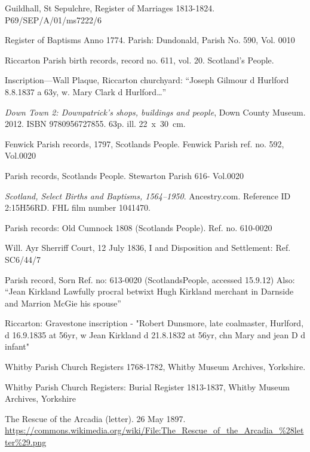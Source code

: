 \begin{thebibliography}{99}
	 Guildhall, St Sepulchre, Register of Marriages 1813-1824. P69/SEP/A/01/ms7222/6

	 Register of Baptisms Anno 1774. Parish: Dundonald, Parish No. 590, Vol. 0010

	Riccarton Parish birth records, record no. 611, vol. 20. Scotland's People.

	Inscription---Wall Plaque, Riccarton churchyard:
	``Joseph Gilmour d Hurlford 8.8.1837 a 63y, w. Mary Clark d Hurlford\dots''

	\emph{Down Town 2: Downpatrick's shops, buildings and people}, Down County Museum.
	2012. ISBN 9780956727855. 63p. ill. 22~x~30~cm.

	Fenwick Parish records, 1797, Scotlands People. Fenwick Parish ref. no. 592, Vol.0020

	Parish records, Scotlands People. Stewarton Parish 616- Vol.0020

	\emph{Scotland, Select Births and Baptisms, 1564--1950}.
	Ancestry.com.
	Reference ID 2:15H56RD. FHL film number 1041470.

	Parish records: Old Cumnock 1808 (Scotlands People). Ref. no. 610-0020

	 Will. Ayr Sherriff Court, 12 July 1836, I and Disposition and Settlement: Ref. SC6/44/7

	Parish record, Sorn Ref. no: 613-0020 (ScotlandsPeople, accessed 15.9.12)
	Also: ``Jean Kirkland Lawfully procral betwixt Hugh Kirkland merchant in Darnside and Marrion McGie his spouse''

	Riccarton: Gravestone inscription - "Robert Dunsmore, late coalmaster, Hurlford, d 16.9.1835 at 56yr,
	w Jean Kirkland d 21.8.1832 at 56yr, chn Mary and jean D d infant"

	Whitby Parish Church Registers 1768-1782, Whitby Museum Archives, Yorkshire.

	Whitby Parish Church Registers: Burial Register 1813-1837, Whitby Museum Archives, Yorkshire

	The Rescue of the Arcadia (letter). 26 May 1897.
	\url{https://commons.wikimedia.org/wiki/File:The_Rescue_of_the_Arcadia_\%28letter\%29.png}


\end{thebibliography}
